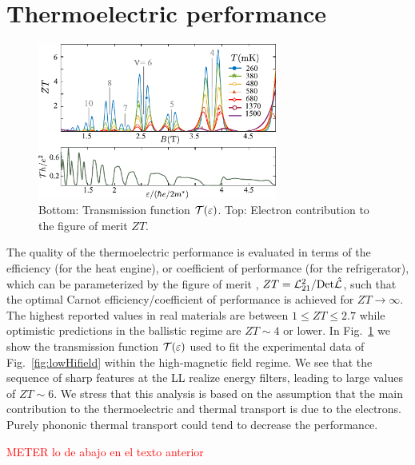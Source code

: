 \section{Thermoelectric performance}

\begin{figure}
    \centering
    \includegraphics[width=0.7\textwidth]{figures/vtpGmodel/termovoltageConductance/fig5.pdf}
    \caption{Bottom: Transmission function ${\cal T}(\varepsilon)$. Top: Electron contribution to the figure of merit $ZT$.}
    \label{fig:ZT}
\end{figure}
The quality of the thermoelectric performance is evaluated in terms of
the efficiency (for the heat engine), 
 or coefficient of performance (for the refrigerator), which can be parameterized by the figure of merit \cite{benenti2016thermal,benenti2017fundamental}, $ZT = {\cal L}_{21}^2/\mbox{Det}{\hat{\cal L}}$,
 such that the optimal Carnot efficiency/coefficient of performance is achieved for $ZT \rightarrow \infty$.
 The highest reported values in real materials are between 
 $1 \leq ZT\leq 2.7$ \cite{benenti2017fundamental} while optimistic predictions in the ballistic regime are
 $ZT \sim 4$ \cite{ozaeta2014predicted} or lower.
 In Fig.~\ref{fig:ZT} we show the transmission function ${\cal T}(\varepsilon)$ used to fit the experimental data of Fig.~\ref{fig:lowHifield} within the high-magnetic field regime. We see that the sequence of sharp features at the LL realize energy filters, leading to large values of  $ZT \sim 6$. 
We stress that this analysis is based on the assumption that the main contribution to the thermoelectric and thermal transport is due to the electrons.
Purely phononic thermal transport could tend to decrease the performance.






\textcolor{red}{METER lo de abajo en el texto anterior}

